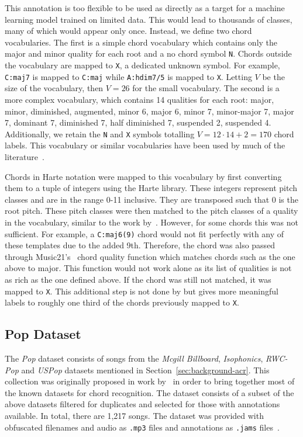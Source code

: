 This annotation is too flexible to be used as directly as a target for a machine learning model trained on limited data. This would lead to thousands of classes, many of which would appear only once. Instead, we define two chord vocabularies. The first is a simple chord vocabulary which contains only the major and minor quality for each root and a no chord symbol \texttt{N}. Chords outside the vocabulary are mapped to \texttt{X}, a dedicated unknown symbol. For example, \texttt{C:maj7} is mapped to \texttt{C:maj} while \texttt{A:hdim7/5} is mapped to \texttt{X}. Letting $V$ be the size of the vocabulary, then $V=26$ for the small vocabulary. The second is a more complex vocabulary, which contains 14 qualities for each root: major, minor, diminished, augmented, minor 6, major 6, minor 7, minor-major 7, major 7, dominant 7, diminished 7, half diminished 7, suspended 2, suspended 4. Additionally, we retain the \texttt{N} and \texttt{X} symbols totalling $V=12\cdot14 + 2 = 170$ chord labels. This vocabulary or similar vocabularies have been used by much of the literature~\citep{StructuredTraining,FourTimelyInsights,ACRLargeVocab1}.

Chords in Harte notation were mapped to this vocabulary by first converting them to a tuple of integers using the Harte library. These integers represent pitch classes and are in the range 0-11 inclusive. They are transposed such that 0 is the root pitch. These pitch classes were then matched to the pitch classes of a quality in the vocabulary, similar to the work by~\citet{StructuredTraining}. However, for some chords this was not sufficient. For example, a \texttt{C:maj6(9)} chord would not fit perfectly with any of these templates due to the added 9th. Therefore, the chord was also passed through Music21's~\citep{music21} chord quality function which matches chords such as the one above to major. This function would not work alone as its list of qualities is not as rich as the one defined above. If the chord was still not matched, it was mapped to \texttt{X}. This additional step is not done by \citet{StructuredTraining} but gives more meaningful labels to roughly one third of the chords previously mapped to \texttt{X}.

\subsection{Pop Dataset}

The \emph{Pop} dataset consists of songs from the \emph{Mcgill Billboard}, \emph{Isophonics}, \emph{RWC-Pop} and \emph{USPop} datasets mentioned in Section~\ref{sec:background-acr}. This collection was originally proposed in work by~\citet{FourTimelyInsights} in order to bring together most of the known datasets for chord recognition. The dataset consists of a subset of the above datasets filtered for duplicates and selected for those with annotations available. In total, there are 1,217 songs. The dataset was provided with obfuscated filenames and audio as \texttt{.mp3} files and annotations as \texttt{.jams} files~\citep{JAMS}. 

